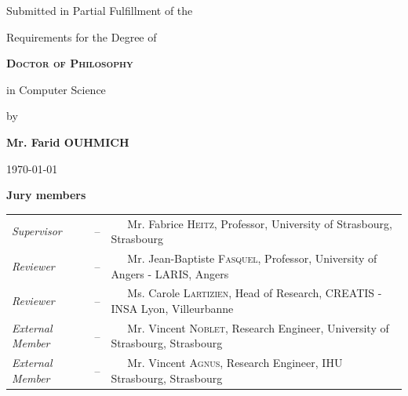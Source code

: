 \begin{titlingpage}
\begin{center}
		\vspace{1\baselineskip}
		
		{\LARGE  Submitted in Partial Fulfillment of the}
		
		{\LARGE Requirements for the Degree of}
		
		\vspace{1\baselineskip}
		
		{\LARGE \textbf {\textsc{Doctor of Philosophy}}}
		
		\vspace{0.2cm}
		
		{\LARGE in  Computer Science}
		
		\vspace{0.7\baselineskip}
		
		{\LARGE by}
		
		\vspace{0.5\baselineskip}
		
		{\LARGE \textbf{Mr. Farid OUHMICH}}
		
		\vspace{1\baselineskip}
		
		{\LARGE \textbf {\textsc{\thetitle}}}
		
		\vspace{1\baselineskip}
	\end{center}
	\vfill
	
	\begin{center}
		\today
	\end{center}
	
	\vspace{1\baselineskip}
	
	\noindent
	\textbf{Jury members}
	
	\begin{tabular}{lcl}
		\textit{Supervisor}& -- &~~~Mr. Fabrice \textsc{Heitz}, Professor, \small University of Strasbourg, Strasbourg\\
		\textit{Reviewer}&-- &~~~Mr. Jean-Baptiste \textsc{Fasquel}, Professor, \small University of  Angers - LARIS, Angers\\
		\textit{Reviewer}& -- &~~~Ms. Carole \textsc{Lartizien}, 
		Head of Research, \small CREATIS - INSA Lyon, Villeurbanne\\
		\textit{External Member}& -- &~~~Mr. Vincent \textsc{Noblet}, 
		Research Engineer, \small University of Strasbourg, Strasbourg\\
		\textit{External Member}& -- &~~~Mr. Vincent \textsc{Agnus}, 
		Research Engineer, \small IHU Strasbourg, Strasbourg\\
	\end{tabular}
	

\end{titlingpage}

